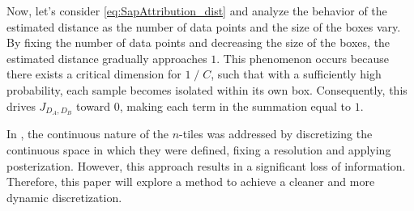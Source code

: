 \noindent Now, let’s consider \cref{eq:SapAttribution_dist} and analyze the behavior of the estimated distance as the number of data points and the size of the boxes vary. By fixing the number of data points and decreasing the size of the boxes, the estimated distance gradually approaches $1$. This phenomenon occurs because there exists a critical dimension for $1 \;/ \; C$, such that with a sufficiently high probability, each sample becomes isolated within its own box. Consequently, this drives $J_{D_A,D_B}$ toward $0$, making each term in the summation equal to $1$.

\bigskip
In \cite{thesis}, the continuous nature of the $n$-tiles was addressed by discretizing the continuous space in which they were defined, fixing a resolution and applying posterization. However, this approach results in a significant loss of information. Therefore, this paper will explore a method to achieve a cleaner and more dynamic discretization.
